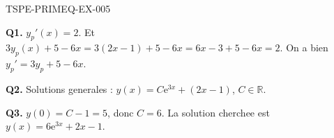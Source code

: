 \begin{corrige}{TSPE-PRIMEQ-EX-005}

\textbf{Q1.} $y_p'(x) = 2$. Et $3y_p(x) + 5 - 6x = 3(2x-1)+5-6x = 6x-3+5-6x = 2$. On a bien $y_p' = 3y_p+5-6x$. \checkmark

\textbf{Q2.} Solutions generales : $y(x) = C\mathrm{e}^{3x} + (2x-1)$, $C \in \mathbb{R}$.

\textbf{Q3.} $y(0) = C - 1 = 5$, donc $C=6$. La solution cherchee est $y(x) = 6\mathrm{e}^{3x}+2x-1$.

\end{corrige}
